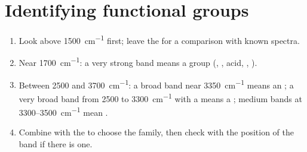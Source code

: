 \section{Identifying functional groups}


\begin{method}\label{met:g11:infrared:reading}
\begin{enumerate}
  \item Look above \qty{1500}{cm^{-1}} first; leave the  for a comparison with known spectra.
  \item Near \qty{1700}{cm^{-1}}: a very strong band means a 
        group (, , acid, , ).
  \item Between 2500 and \qty{3700}{cm^{-1}}: a broad band near
        \qty{3350}{cm^{-1}} means an  ; a very broad band
        from 2500 to \qty{3300}{cm^{-1}} with a  means a
        ; medium bands at 3300--\qty{3500}{cm^{-1}} mean
        .
  \item Combine with the  to choose the family, then
        check with the position of the  band if there is one.
\end{enumerate}
\end{method}

